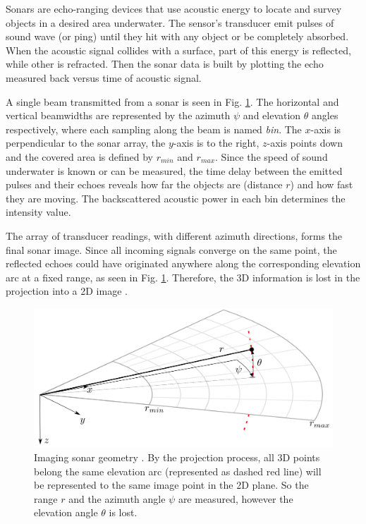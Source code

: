 \documentclass[final,5p,times]{elsarticle}
\begin{document}
Sonars are echo-ranging devices that use acoustic energy to locate and survey objects in a desired area underwater. The sensor's transducer emit pulses of sound wave (or ping) until they hit with any object or be completely absorbed. When the acoustic signal collides with a surface, part of this energy is reflected, while other is refracted. Then the sonar data is built by plotting the echo measured back versus time of acoustic signal.

A single beam transmitted from a sonar is seen in Fig. \ref{fig:sonar_geometry}. The horizontal and vertical beamwidths are represented by the azimuth $\psi$ and elevation $\theta$ angles respectively, where each sampling along the beam is named \textit{bin}. The $x$-axis is perpendicular to the sonar array, the $y$-axis is to the right, $z$-axis points down and the covered area is defined by $r_{min}$ and $r_{max}$. Since the speed of sound underwater is known or can be measured, the time delay between the emitted pulses and their echoes reveals how far the objects are (distance $r$) and how fast they are moving. The backscattered acoustic power in each bin determines the intensity value.

The array of transducer readings, with different azimuth directions, forms the final sonar image. Since all incoming signals converge on the same point, the reflected echoes could have originated anywhere along the corresponding elevation arc at a fixed range, as seen in Fig. \ref{fig:sonar_geometry}. Therefore, the 3D information is lost in the projection into a 2D image \cite{huang2015}.


\begin{figure}[h]
    \includegraphics[width=\columnwidth]{figs/sonar_geometry}
    \centering
    \captionsetup{justification=centering}
    \caption{Imaging sonar geometry \cite{huang2015}. By the projection process, all 3D points belong the same elevation arc (represented as dashed red line) will be represented to the same image point in the 2D plane. So the range $r$ and the azimuth angle $\psi$ are measured, however the elevation angle $\theta$ is lost.}
    \label{fig:sonar_geometry}
\end{figure}
\end{document}
